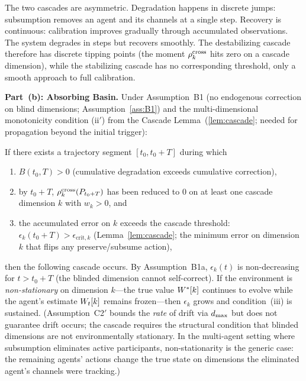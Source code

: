 \begin{theorem}
\begin{remark}
The two cascades are asymmetric.  Degradation happens in discrete
jumps: subsumption removes an agent and its channels at a single step.
Recovery is continuous: calibration improves gradually through
accumulated observations.  The system degrades in steps but recovers
smoothly.  The destabilizing cascade therefore has discrete tipping
points (the moment $\rho^{\mathrm{cross}}_k$ hits zero on a cascade dimension),
while the stabilizing cascade has no corresponding threshold, only a
smooth approach to full calibration.
\end{remark}

\medskip
\noindent\textbf{Part~(b): Absorbing Basin.}
Under Assumption~B1 (no endogenous correction on blind dimensions;
Assumption~\ref{ass:B1}) and the multi-dimensional monotonicity
condition (ii$'$) from the Cascade Lemma~(\ref{lem:cascade}; needed
for propagation beyond the initial trigger):

If there exists a trajectory segment $[t_0, t_0 + T]$ during which
\begin{enumerate}
\item[(i)] $B(t_0, T) > 0$ (cumulative degradation exceeds cumulative
  correction),
\item[(ii)] by $t_0 + T$, $\rho^{\mathrm{cross}}_k(P_{t_0+T})$ has been reduced to $0$
  on at least one cascade dimension $k$ with $w_k > 0$, and
\item[(iii)] the accumulated error on $k$ exceeds the cascade
  threshold: $\epsilon_k(t_0 + T) > \epsilon_{\mathrm{crit},k}$
  (Lemma~\ref{lem:cascade}; the minimum error on dimension $k$ that
  flips any preserve/subsume action),
\end{enumerate}
then the following cascade occurs.  By Assumption~B1a,
$\epsilon_k(t)$ is non-decreasing for $t > t_0 + T$ (the blinded
dimension cannot self-correct).  If the environment is
\emph{non-stationary} on dimension $k$---the true value $W^*[k]$
continues to evolve while the agent's estimate $W_t[k]$ remains
frozen---then $\epsilon_k$ grows and condition~(iii) is sustained.
(Assumption~C2$'$ bounds the \emph{rate} of drift via $d_{\mathrm{max}}$ but does
not guarantee drift occurs; the cascade requires the structural
condition that blinded dimensions are not environmentally stationary.
In the multi-agent setting where subsumption eliminates active
participants, non-stationarity is the generic case: the remaining
agents' actions change the true state on dimensions the eliminated
agent's channels were tracking.)


\end{theorem}
